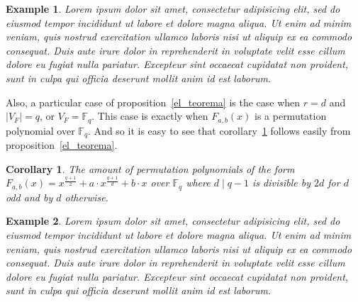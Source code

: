 \documentclass[landscape,final,paperwidth=48in,paperheight=38in]{baposter}
\newtheorem{corollary}{Corollary}
\newtheorem{example}{Example}
\begin{document}
\begin{poster}
{\begin{multicols}{2}
    \begin{example}
      Lorem ipsum dolor sit amet, consectetur adipisicing elit, sed do eiusmod
      tempor incididunt ut labore et dolore magna aliqua. Ut enim ad minim veniam,
      quis nostrud exercitation ullamco laboris nisi ut aliquip ex ea commodo
      consequat. Duis aute irure dolor in reprehenderit in voluptate velit esse
      cillum dolore eu fugiat nulla pariatur. Excepteur sint occaecat cupidatat non
      proident, sunt in culpa qui officia deserunt mollit anim id est laborum.
    \end{example}

    Also, a particular case of proposition~\ref{el_teorema} is the case when $r=d$ and $\left\vert V_{F} \right\vert = q$, or $V_{F} = \mathbb{F}_{q}$. This case is exactly when $F_{a,b}(x)$ is a permutation polynomial over $\mathbb{F}_{q}$. And so it is easy to see that corollary~\ref{cantidad_pp} follows easily from proposition~\ref{el_teorema}.

    \begin{corollary}\label{cantidad_pp}
      The amount of permutation polynomials of the form $F_{a,b}(x) = x^{\frac{q+1}{2}} + a\cdot x^{\frac{q+1}{d}} + b\cdot x$ over $\mathbb{F}_{q}$ where $d \mid q-1$ is divisible by $2d$ for $d$ odd and by $d$ otherwise.
    \end{corollary}

    \begin{example}
      Lorem ipsum dolor sit amet, consectetur adipisicing elit, sed do eiusmod
      tempor incididunt ut labore et dolore magna aliqua. Ut enim ad minim veniam,
      quis nostrud exercitation ullamco laboris nisi ut aliquip ex ea commodo
      consequat. Duis aute irure dolor in reprehenderit in voluptate velit esse
      cillum dolore eu fugiat nulla pariatur. Excepteur sint occaecat cupidatat non
      proident, sunt in culpa qui officia deserunt mollit anim id est laborum.
    \end{example}

  \end{multicols}
   \vspace{0.3em}
  }\label{Conditions for PP}

  \label{Future Work}


\end{poster}
\end{document}
